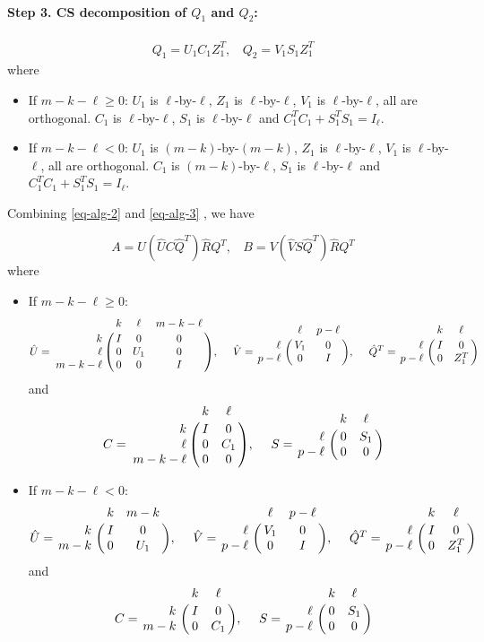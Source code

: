 \paragraph{Step 3. CS decomposition of $Q_1$ and $Q_2$:}
\begin{align} \label{eq-alg-3}
Q_1 = U_1C_1Z_1^{T}, \ \ \ \ 
Q_2 = V_1S_1Z_1^{T}
\end{align}
where
\begin{itemize}
	\item If $m-k-\ell \geq 0$:
		$U_{1}$ is $\ell$-by-$\ell$, $Z_{1}$ is $\ell$-by-$\ell$, $V_{1}$ is $\ell$-by-$\ell$, all are orthogonal. $C_{1}$ is $\ell$-by-$\ell$, $S_{1}$ is $\ell$-by-$\ell$ and $C_{1}^{T}C_{1} + S_{1}^{T}S_{1} = I_{\ell}$.

	\item If $m-k-\ell < 0$:
		$U_{1}$ is $(m-k)$-by-$(m-k)$, $Z_{1}$ is $\ell$-by-$\ell$, $V_{1}$ is $\ell$-by-$\ell$, all are orthogonal. $C_{1}$ is $(m-k)$-by-$\ell$, $S_{1}$ is $\ell$-by-$\ell$ and $C_{1}^{T}C_{1} + S_{1}^{T}S_{1} = I_{\ell}$.
\end{itemize}
%
%
%
Combining \eqref{eq-alg-2} and \eqref{eq-alg-3} , we have

\begin{equation} \label{eq-alg-4}
A = U(\hat{U}C\hat{Q}^{T})\hat{R}Q^{T}, \ \ \ \ 
B = V(\hat{V}S\hat{Q}^{T})\hat{R}Q^{T}
\end{equation}
where
\begin{itemize}
\item If $m-k-\ell \geq 0$:
	\[
                \hat{U} = \bordermatrix{ & k & \ell & m-k-\ell\cr
                \hfill k & I & 0 & 0\cr
                \hfill \ell & 0 & U_1 & 0\cr
                \hfill m-k-\ell & 0 & 0 & I}, \  \ \ \
                \hat{V} = \bordermatrix{ & \ell & p-\ell   \cr
                \hfill \ell & V_1 & 0\cr
                \hfill p-\ell & 0 & I}, \ \ \ \
                \hat{Q}^{T} = \bordermatrix{ & k & \ell   \cr
                \hfill \ell & I & 0\cr
                \hfill p-\ell & 0 & Z_1^{T}}
     \]
     and 
     \[
                C = \bordermatrix{ & k & \ell \cr
                \hfill k & I & 0 \cr
                \hfill \ell & 0 & C_1 \cr
                \hfill m-k-\ell & 0 & 0}, \  \ \ \
                S = \bordermatrix{ & k & \ell   \cr
                \hfill \ell & 0 & S_1\cr
                \hfill p-\ell & 0 & 0}
    \]
\item If $m-k-\ell < 0$:
	\[
                \hat{U} = \bordermatrix{ & k & m-k \cr
                \hfill k & I & 0 \cr
                \hfill m-k & 0 & U_1}, \  \ \ \
                \hat{V} = \bordermatrix{ & \ell & p-\ell   \cr
                \hfill \ell & V_1 & 0\cr
                \hfill p-\ell & 0 & I}, \ \ \ \
                \hat{Q}^{T} = \bordermatrix{ & k & \ell   \cr
                \hfill \ell & I & 0\cr
                \hfill p-\ell & 0 & Z_1^{T}}
     \]
     and 
     \[
                C = \bordermatrix{ & k & \ell \cr
                \hfill k & I & 0 \cr
                \hfill m-k & 0 & C_1}, \  \ \ \
                S = \bordermatrix{ & k & \ell   \cr
                \hfill \ell & 0 & S_1\cr
                \hfill p-\ell & 0 & 0}
    \]
\end{itemize}

